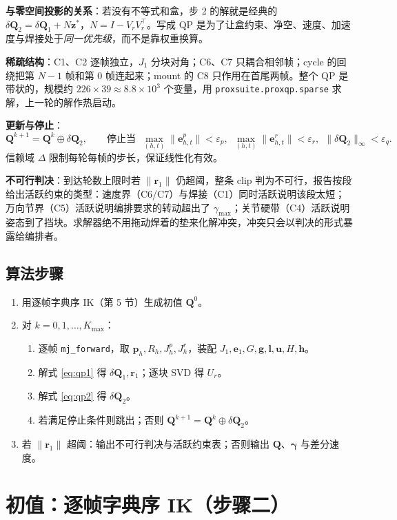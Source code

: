 \documentclass[11pt]{article}
\newcommand{\code}[1]{\texttt{\small #1}}
\newcommand{\dQ}{\delta\bm Q}
\begin{document}
\textbf{与零空间投影的关系}：若没有不等式和盒，步 2 的解就是经典的 $\dQ_2=\dQ_1+N\bm z^*$，$N=I-V_rV_r^{\top}$。写成 QP 是为了让盒约束、净空、速度、加速度与焊接处于\emph{同一优先级}，而不是靠权重换算。

\textbf{稀疏结构}：C1、C2 逐帧独立，$J_1$ 分块对角；C6、C7 只耦合相邻帧；cycle 的回绕把第 $N-1$ 帧和第 0 帧连起来；mount 的 C8 只作用在首尾两帧。整个 QP 是带状的，规模约 $226\times39\approx 8.8\times10^3$ 个变量，用 \code{proxsuite.proxqp.sparse} 求解，上一轮的解作热启动。

\textbf{更新与停止}：
\begin{equation}
\bm Q^{k+1}=\bm Q^k\oplus\dQ_2,\qquad
\text{停止当 }\ \max_{(h,t)}\|\bm e^p_{h,t}\|<\varepsilon_p,\ \ \max_{(h,t)}\|\bm e^r_{h,t}\|<\varepsilon_r,\ \ \|\dQ_2\|_\infty<\varepsilon_q .
\end{equation}
信赖域 $\Delta$ 限制每轮每帧的步长，保证线性化有效。

\textbf{不可行判决}：到达轮数上限时若 $\|\bm r_1\|$ 仍超阈，整条 clip 判为不可行，报告按段给出活跃约束的类型：速度界（C6/C7）与焊接（C1）同时活跃说明该段太短；万向节界（C5）活跃说明编排要求的转动超出了 $\gamma_{\max}$；关节硬带（C4）活跃说明姿态到了挡块。求解器绝不用拖动焊着的垫来化解冲突，冲突只会以判决的形式暴露给编排者。

\subsection*{算法步骤}
\begin{enumerate}[leftmargin=1.8em]
\item 用逐帧字典序 IK（第 5 节）生成初值 $\bm Q^0$。
\item 对 $k=0,1,\dots,K_{\max}$：
  \begin{enumerate}[leftmargin=1.4em]
  \item 逐帧 \code{mj\_forward}，取 $\bm p_h,R_h,J^p_h,J^r_h$，装配 $J_1,\bm e_1,G,\bm g,\bm l,\bm u,H,\bm h$。
  \item 解式 \eqref{eq:qp1} 得 $\dQ_1,\bm r_1$；逐块 SVD 得 $U_r$。
  \item 解式 \eqref{eq:qp2} 得 $\dQ_2$。
  \item 若满足停止条件则跳出；否则 $\bm Q^{k+1}=\bm Q^k\oplus\dQ_2$。
  \end{enumerate}
\item 若 $\|\bm r_1\|$ 超阈：输出不可行判决与活跃约束表；否则输出 $\bm Q$、$\bm\gamma$ 与差分速度。
\end{enumerate}

\section{初值：逐帧字典序 IK（步骤二）}
\end{document}
